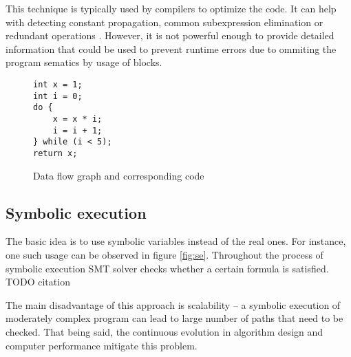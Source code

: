\documentclass[12pt,final,oneside]{fithesis2}
\theoremstyle{definition}
\begin{document}
This technique is typically used by compilers to optimize the code. It
can help with detecting constant propagation, common subexpression
elimination or redundant operations \cite{Kildall73-1}. However, it is
not powerful enough to provide detailed information that could be used
to prevent runtime errors due to ommiting the program sematics by usage
of blocks.

\begin{figure}[h]
\begin{minipage}{0.3\textwidth}
\begin{lstlisting}
int x = 1;
int i = 0;
do {
    x = x * i;
    i = i + 1;
} while (i < 5);
return x;
\end{lstlisting}
\end{minipage}
\begin{minipage}{0.7\textwidth}
\centering
{}
\end{minipage}
\caption{Data flow graph and corresponding code}
\label{fig:dfg}
\end{figure}


\subsection{Symbolic execution}

The basic idea is to use symbolic variables instead of the real ones.
For instance, one such usage can be observed in figure \ref{fig:se}.
Throughout the process of symbolic execution SMT solver checks whether
a certain formula is satisfied. TODO citation

The main disadvantage of this approach is scalability -- a symbolic
execution of moderately complex program can lead to large number of paths
that need to be checked. That being said, the continuous evolution in
algorithm design and computer performance mitigate this problem.
\end{document}
